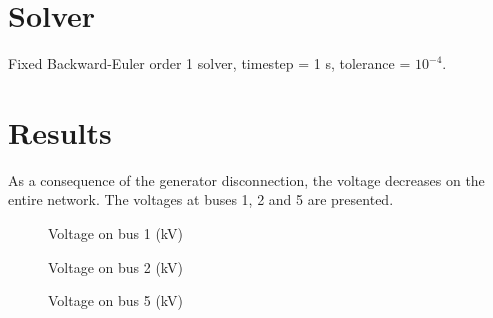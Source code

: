 \documentclass[a4paper, 12pt]{report}
\begin{document}
\section{Solver}

Fixed Backward-Euler order 1 solver, timestep = 1 s, tolerance = $10^{-4}$.

\section{Results}

As a consequence of the generator disconnection, the voltage decreases on the entire network. The voltages at buses 1, 2 and 5 are presented.

\begin{figure}[H]
  \centering
    \caption{Voltage on bus 1 (kV)}
    \caption{Voltage on bus 2 (kV)}
    \caption{Voltage on bus 5 (kV)}
\end{figure}
\end{document}
